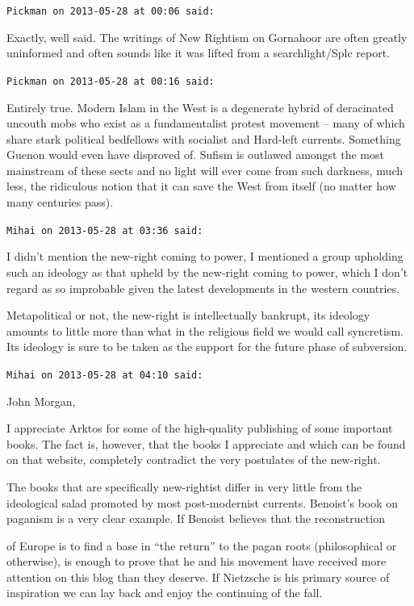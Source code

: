 \begin{footnotesize}
\begin{sffamily}
\hfill

\texttt{Pickman on 2013-05-28 at 00:06 said:}

Exactly, well said. The writings of New Rightism on Gornahoor are often greatly uninformed and often sounds like it was lifted from a searchlight/Splc report.

\hfill

\texttt{Pickman on 2013-05-28 at 00:16 said:}

Entirely true. Modern Islam in the West is a degenerate hybrid of deracinated uncouth mobs who exist as a fundamentalist protest movement -- many of which share stark political bedfellows with socialist and Hard-left currents. Something Guenon would even have disproved of. Sufism is outlawed amongst the most mainstream of these sects and no light will ever come from such darkness, much less, the ridiculous notion that it can save the West from itself (no matter how many centuries pass).

\hfill

\texttt{Mihai on 2013-05-28 at 03:36 said:}

I didn't mention the new-right coming to power, I mentioned a group upholding such an ideology as that upheld by the new-right coming to power, which I don't regard as so improbable given the latest developments in the western countries.

Metapolitical or not, the new-right is intellectually bankrupt, its ideology amounts to little more than what in the religious field we would call syncretism. Its ideology is sure to be taken as the support for the future phase of subversion.

\hfill

\texttt{Mihai on 2013-05-28 at 04:10 said:}

John Morgan,

I appreciate Arktos for some of the high-quality publishing of some important books. The fact is, however, that the books I appreciate and which can be found on that website, completely contradict the very postulates of the new-right.

The books that are specifically new-rightist differ in very little from the ideological salad promoted by most post-modernist currents. Benoist's book on paganism is a very clear example. If Benoist believes that the reconstruction

of Europe is to find a base in ``the return'' to the pagan roots (philosophical or otherwise), is enough to prove that he and his movement have received more attention on this blog than they deserve. If Nietzsche is his primary source of inspiration we can lay back and enjoy the continuing of the fall.


\end{sffamily}
\end{footnotesize}
